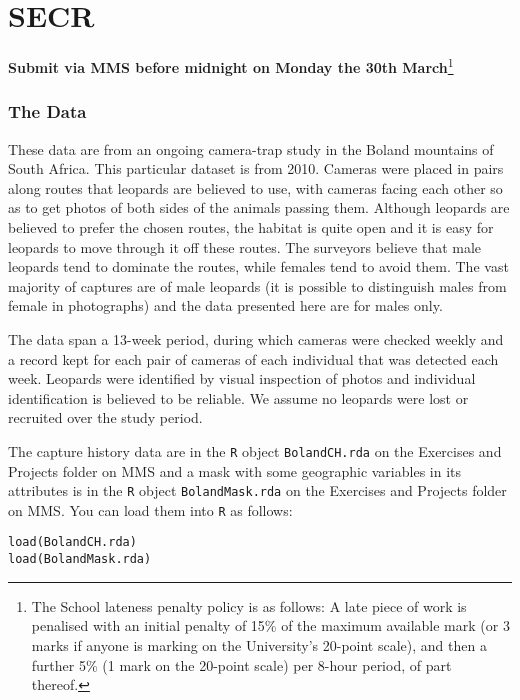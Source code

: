 \chapter{SECR\label{sec:secr_proj}}


\begin{center}
\textbf{Submit via MMS before midnight on Monday the 30th March}\footnote{The School lateness penalty policy is as follows: A late piece of work is penalised with an initial penalty of 15\% of the maximum available mark (or 3 marks if anyone is marking on the University's 20-point scale), and then a further 5\% (1 mark on the 20-point scale) per 8-hour period, of part thereof.}
\end{center}

\subsection*{The Data}

These data are from an ongoing camera-trap study in the Boland mountains of South Africa. This particular dataset is from  2010. Cameras were placed in pairs along routes that leopards are believed to use, with cameras facing each other so as to get photos of both sides of the animals passing them. Although leopards are believed to prefer the chosen routes, the habitat is quite open and it is easy for leopards to move through it off these routes. The surveyors believe that male leopards tend to dominate the routes, while females tend to avoid them. The vast majority of captures are of male leopards (it is possible to distinguish males from female in photographs) and the data presented here are for males only.

The data span a 13-week period, during which cameras were checked weekly and a record kept for each pair of cameras of each individual that was detected each week. Leopards were identified by visual inspection of photos and individual identification is believed to be reliable. We assume no leopards were lost or recruited over the study period.

The capture history data are in the \texttt{R} object \verb|BolandCH.rda| on the Exercises and Projects folder on MMS and a mask with some geographic variables in its attributes is in the \texttt{R} object \verb|BolandMask.rda| on the Exercises and Projects folder on MMS. You can load them into \verb|R| as follows:

\begin{verbatim}
load(BolandCH.rda)
load(BolandMask.rda)
\end{verbatim}

